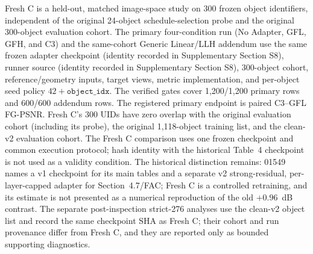 \documentclass[times,twocolumn,final]{elsarticle}
\providecommand{\DIFadd}[1]{{\protect\color{blue} \sf #1}} %
\providecommand{\DIFaddbegin}{} %
\providecommand{\DIFaddend}{} %
\begin{document}
  \DIFaddbegin \DIFadd{Fresh C is a held-out, matched image-space study on 300 frozen object identifiers, independent of the original 24-object schedule-selection probe and the original 300-object evaluation cohort. The primary four-condition run (No Adapter, GFL, GFH, and C3) and the same-cohort Generic Linear/LLH addendum use the same frozen adapter checkpoint (identity recorded in Supplementary Section S8), runner source (identity recorded in Supplementary Section S8), 300-object cohort, reference/geometry inputs}\DIFaddend , target views,   \DIFaddbegin \DIFadd{metric implementation, }\DIFaddend and  
 \DIFaddbegin \DIFadd{per-object seed policy $42+\texttt{object\_idx}$. The verified gates cover 1,200/1,200 primary rows and 600/600 addendum rows. The registered primary endpoint is paired C3--GFL FG-PSNR. Fresh C's 300 UIDs have zero overlap with the original evaluation cohort (including its probe), }\DIFaddend the   \DIFaddbegin \DIFadd{original 1,118-object training list, and the clean-v2 evaluation cohort. The Fresh C comparison uses one frozen checkpoint and common execution protocol; hash identity with the historical Table~4 checkpoint is not used as a validity condition. The historical distinction remains: 01549 names a v1 checkpoint for its main tables and a separate v2 strong-residual, per-layer-capped adapter for Section~4.7/FAC; Fresh C is a controlled retraining, and its estimate is not presented as a numerical reproduction of the old $+0.96$~dB contrast. The separate post-inspection strict-276 analyses use the clean-v2 object list and record the same checkpoint SHA as Fresh C; their cohort and run provenance differ from Fresh C, and they are reported only as bounded supporting diagnostics}\DIFaddend .
\end{document}
